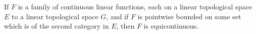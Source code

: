 If $F$ is a family of continuous linear functions, each on a linear topological space $E$ to a linear topological space $G$, and if $F$ is pointwise bounded on some set which is of the second category in $E$, then $F$ is equicontinuous.
